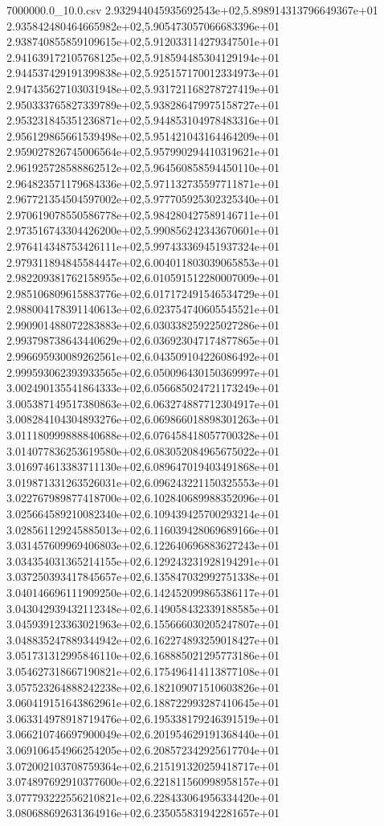 \begin{filecontents*}{7000000.0_10.0.csv}
2.932944045935692543e+02,5.898914313796649367e+01
2.935842480464665982e+02,5.905473057066683396e+01
2.938740855859109615e+02,5.912033114279347501e+01
2.941639172105768125e+02,5.918594485304129194e+01
2.944537429191399838e+02,5.925157170012334973e+01
2.947435627103031948e+02,5.931721168278727419e+01
2.950333765827339789e+02,5.938286479975158727e+01
2.953231845351236871e+02,5.944853104978483316e+01
2.956129865661539498e+02,5.951421043164464209e+01
2.959027826745006564e+02,5.957990294410319621e+01
2.961925728588862512e+02,5.964560858594450110e+01
2.964823571179684336e+02,5.971132735597711871e+01
2.967721354504597002e+02,5.977705925302325340e+01
2.970619078550586778e+02,5.984280427589146711e+01
2.973516743304426200e+02,5.990856242343670601e+01
2.976414348753426111e+02,5.997433369451937324e+01
2.979311894845584447e+02,6.004011803039065853e+01
2.982209381762158955e+02,6.010591512280007009e+01
2.985106809615883776e+02,6.017172491546534729e+01
2.988004178391140613e+02,6.023754740605545521e+01
2.990901488072283883e+02,6.030338259225027286e+01
2.993798738643440629e+02,6.036923047174877865e+01
2.996695930089262561e+02,6.043509104226086492e+01
2.999593062393933565e+02,6.050096430150369997e+01
3.002490135541864333e+02,6.056685024721173249e+01
3.005387149517380863e+02,6.063274887712304917e+01
3.008284104304893276e+02,6.069866018898301263e+01
3.011180999888840688e+02,6.076458418057700328e+01
3.014077836253619580e+02,6.083052084965675022e+01
3.016974613383711130e+02,6.089647019403491868e+01
3.019871331263526031e+02,6.096243221150325553e+01
3.022767989877418700e+02,6.102840689988352096e+01
3.025664589210082340e+02,6.109439425700293214e+01
3.028561129245885013e+02,6.116039428069689166e+01
3.031457609969406803e+02,6.122640696883627243e+01
3.034354031365214155e+02,6.129243231928194291e+01
3.037250393417845657e+02,6.135847032992751338e+01
3.040146696111909250e+02,6.142452099865386117e+01
3.043042939432112348e+02,6.149058432339188585e+01
3.045939123363021963e+02,6.155666030205247807e+01
3.048835247889344942e+02,6.162274893259018427e+01
3.051731312995846110e+02,6.168885021295773186e+01
3.054627318667190821e+02,6.175496414113877108e+01
3.057523264888242238e+02,6.182109071510603826e+01
3.060419151643862961e+02,6.188722993287410645e+01
3.063314978918719476e+02,6.195338179246391519e+01
3.066210746697900049e+02,6.201954629191368440e+01
3.069106454966254205e+02,6.208572342925617704e+01
3.072002103708759364e+02,6.215191320259418717e+01
3.074897692910377600e+02,6.221811560998958157e+01
3.077793222556210821e+02,6.228433064956334420e+01
3.080688692631364916e+02,6.235055831942281657e+01

\end{filecontents*}
